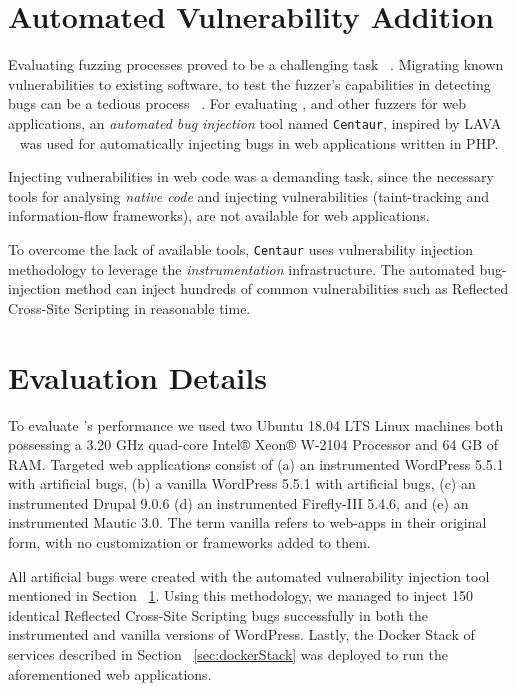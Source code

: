 \section{Automated Vulnerability Addition}\label{sec:automated}
Evaluating fuzzing processes proved to be a challenging task ~\cite{klees2018Evaluation}. Migrating known vulnerabilities to existing software, to test the fuzzer's capabilities in detecting bugs can be a tedious process ~\cite{bug-reproduction}. For evaluating \pname{}, and other fuzzers for web applications, an \emph{automated bug injection} tool named {\tt Centaur}, inspired by LAVA ~\cite{dolan2016lava} was used for automatically injecting bugs in web applications written in PHP. 

Injecting vulnerabilities in web code was a demanding task, since the necessary tools for analysing \emph{native code} and injecting vulnerabilities (\eg taint-tracking and information-flow frameworks), are not available for web applications. 

To overcome the lack of available tools, {\tt Centaur} uses vulnerability injection methodology to leverage the \emph{instrumentation} infrastructure. The automated bug-injection method can inject hundreds of common vulnerabilities such as Reflected Cross-Site Scripting in reasonable time. 

\section{Evaluation Details}
To evaluate \pname{}'s performance we used two Ubuntu 18.04 LTS Linux machines both possessing a 3.20 GHz quad-core Intel® Xeon® W-2104 Processor and 64 GB of RAM. Targeted web applications consist of (a) an instrumented WordPress 5.5.1 with artificial bugs, (b) a vanilla  WordPress 5.5.1 with artificial bugs, (c) an instrumented Drupal 9.0.6 (d) an instrumented Firefly-III 5.4.6, and (e) an instrumented Mautic 3.0. The term vanilla refers to web-apps in their original form, with no customization or frameworks added to them. 

All artificial bugs were created with the automated vulnerability injection tool mentioned in  Section ~\ref{sec:automated}. Using this methodology, we managed to inject 150 identical Reflected Cross-Site Scripting bugs successfully in both the instrumented and vanilla versions of WordPress. Lastly, the Docker Stack of services described in Section ~\ref{sec:dockerStack} was deployed to run the aforementioned web applications.

